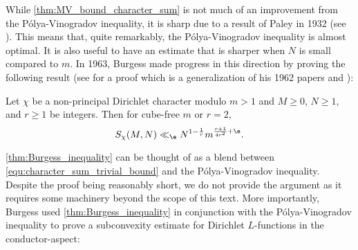     While \cref{thm:MV_bound_character_sum} is not much of an improvement from the P\'olya-Vinogradov inequality, it is sharp due to a result of Paley in 1932 (see \cite{paley1932theorem}). This means that, quite remarkably, the P\'olya-Vinogradov inequality is almost optimal. It is also useful to have an estimate that is sharper when $N$ is small compared to $m$. In 1963, Burgess made progress in this direction by proving the following result (see \cite{burgess1963character} for a proof which is a generalization of his 1962 papers \cite{burgess1962characterL-series} and \cite{burgess1962characterprimitive}):

    \begin{theorem}\label{thm:Burgess_inequality}
      Let $\chi$ be a non-principal Dirichlet character modulo $m > 1$ and $M \ge 0$, $N \ge 1$, and $r \ge 1$ be integers. Then for cube-free $m$ or $r = 2$,
      \[
        S_{\chi}(M,N) \ll_{\e} N^{1-\frac{1}{r}}m^{\frac{r+1}{4r^{2}}+\e}.
      \]
    \end{theorem}

    \cref{thm:Burgess_inequality} can be thought of as a blend between \cref{equ:character_sum_trivial_bound} and the P\'olya-Vinogradov inequality. Despite the proof being reasonably short, we do not provide the argument as it requires some machinery beyond the scope of this text. More importantly, Burgess used \cref{thm:Burgess_inequality} in conjunction with the P\'olya-Vinogradov inequality to prove a subconvexity estimate for Dirichlet $L$-functions in the conductor-aspect:

